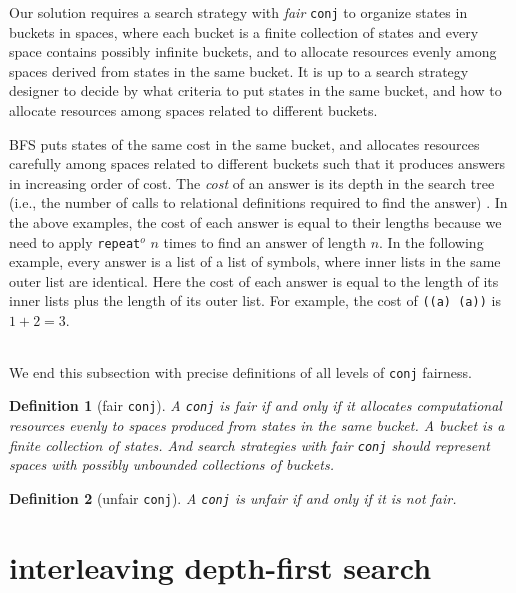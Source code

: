 \documentclass[acmlarge]{acmart}
\newcommand{\conj}{\texttt{conj}}
\newcommand{\repeato}{\texttt{repeat$^o$}}
\newcommand{\BFS}[0]{BFS}
\newtheorem{defn}{Definition}[section]
\begin{document}
Our solution requires a search strategy with \emph{fair} \conj{} to organize
states in buckets in spaces, where each bucket is a finite collection of states
and every space contains possibly infinite buckets,
and 
to allocate resources evenly among spaces derived from states in the 
same bucket. It is up to a search strategy designer to decide by what criteria 
to 
put states in the same bucket, and how to allocate resources among spaces 
related to different buckets.

\BFS{} puts states of the same cost in the same bucket, and allocates
resources carefully among spaces related to different buckets such
that it produces answers in increasing order of cost. The \emph{cost}
of an answer is its depth in the search tree (i.e., the number of
calls to relational definitions required to find the answer) 
\citep{seres1999algebra}. In the above examples, the cost of each answer is 
equal to their lengths because we need to apply \repeato{} $n$ times to find an 
answer of length $n$. In the following example, every answer is a list of a 
list of symbols, where inner lists in the same outer list are identical. Here 
the cost of each answer is equal to the length of its inner lists plus the 
length of its outer list. For example, the cost of \texttt{((a) (a))} is $1 + 2 
= 3$.

\begin{center}
	\begin{tabular}{c}
		
	\end{tabular}
\end{center}
 
We end this subsection with precise definitions of all levels of \conj{} 
fairness.

\begin{defn}[fair \conj{}]
A \conj{} is fair if and only if it allocates computational resources evenly to 
spaces produced from states in the same bucket. A bucket is a finite 
collection of states. And search strategies with fair \conj{} should represent 
spaces with possibly unbounded collections of buckets. 
\end{defn}

\begin{defn}[unfair \conj{}]
A \conj{} is unfair if and only if it is not fair.
\end{defn}

\section{interleaving depth-first search}
\end{document}
